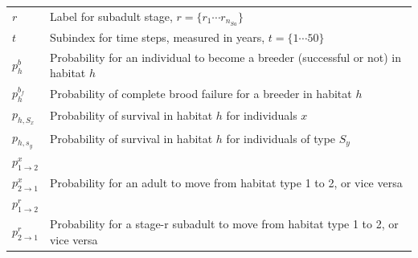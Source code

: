\begin{table}
\begin{tabular}[b]{@{}p{1.5cm}p{13cm}@{}}
$r$   & Label for subadult stage, $r= \{r_{1} \cdots r_{n_{Sa}}\}$                                                                                                                                                                                                                                                           \\
$t$   & Subindex for time steps, measured in years, $t= \{1 \cdots 50\}$                                                                                                                                                                                                                                                     \\
${p}_{h}^{b}$     & Probability for an individual to become a breeder (successful or not) in habitat $h$                                                                                                                                                                                                                     \\
${p}_{h}^{b_{f}}$ & Probability of complete brood failure for a breeder in habitat $h$                                                                                                                                                                                                                                       \\
${p}_{h,S_{x}}$   & Probability of survival in habitat $h$ for individuals $x$                                                                                                                                                                                                                                               \\
$p_{h, s_{y}}$    & Probability of survival in habitat $h$ for individuals of type $S_{y}$                                                                                                                                                                                                                                   \\
\noalign{\bigskip}
${p}_{1\rightarrow2}^{x}$ \\ ${p}_{2\rightarrow1}^{x}$ & Probability for an adult to move from habitat type 1 to 2, or vice versa                                                                                                                                                                                            \\
\noalign{\bigskip}
${p}_{1\rightarrow2}^{r}$ \\ ${p}_{2\rightarrow1}^{r}$ & Probability for a stage-r subadult to move from habitat type 1 to 2, or vice versa                                                                                                                                                                                  \\ \bottomrule
\end{tabular}
\end{table}



